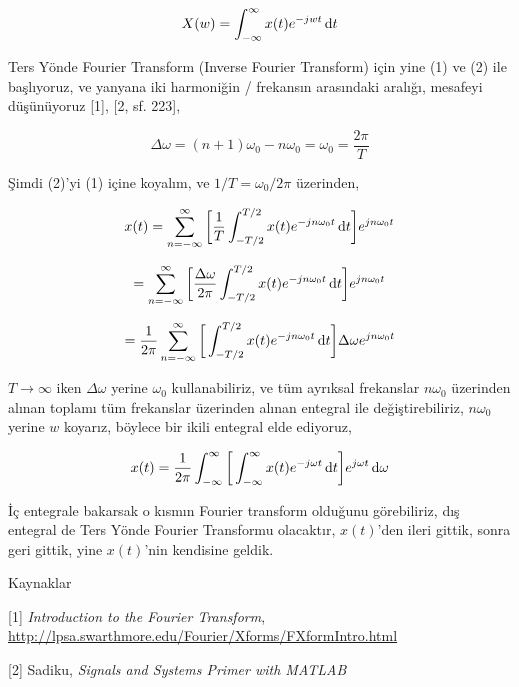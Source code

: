 \documentclass[12pt,fleqn]{article}\usepackage{../../common}
\begin{document}
$$ X(w) = \int _{-\infty}^{\infty} x(t) e^{-jwt} \,\mathrm{d} t$$

Ters Yönde Fourier Transform (Inverse Fourier Transform) için yine (1) ve
(2) ile başlıyoruz, ve yanyana iki harmoniğin / frekansın arasındaki
aralığı, mesafeyi düşünüyoruz [1], [2, sf. 223],

$$ \Delta \omega = (n+1) \omega_0 - n \omega_0 = \omega_0 = \frac{2\pi}{T} $$

Şimdi (2)'yi (1) içine koyalım, ve $1/T = \omega_0 / 2\pi$ üzerinden,

$$ 
x(t) = \sum _{n=-\infty}^{\infty} \bigg[ 
\frac{1}{T} \int _{-T/2}^{T/2} x(t) e ^{-jn\omega_0 t} \,\mathrm{d} t
\bigg]  e ^{jn\omega_0 t}
$$


$$ 
= \sum _{n=-\infty}^{\infty} \bigg[ 
\frac{\Delta \omega}{2\pi} \int _{-T/2}^{T/2} x(t) e ^{-jn\omega_0 t} \,\mathrm{d} t
\bigg]  e ^{jn\omega_0 t}
$$


$$ 
= \frac{1}{2\pi} \sum _{n=-\infty}^{\infty} \bigg[ 
\int _{-T/2}^{T/2} x(t) e ^{-jn\omega_0 t} \,\mathrm{d} t
\bigg] \Delta \omega e ^{jn\omega_0 t}
$$

$T \to \infty$ iken $\Delta \omega$ yerine $\omega_0$ kullanabiliriz, ve
tüm ayrıksal frekanslar $n\omega_0$ üzerinden alınan toplamı tüm frekanslar
üzerinden alınan entegral ile değiştirebiliriz, $n\omega_0$ yerine $w$
koyarız, böylece bir ikili entegral elde ediyoruz, 

$$ x(t) = \frac{1}{2\pi} \int _{-\infty}^{\infty} \bigg[
\int _{-\infty}^{\infty} x(t) e ^{-j\omega t} \,\mathrm{d} t
\bigg] e ^{j\omega t}  \,\mathrm{d} \omega
$$

İç entegrale bakarsak o kısmın Fourier transform olduğunu görebiliriz, dış
entegral de Ters Yönde Fourier Transformu olacaktır, $x(t)$'den ileri
gittik, sonra geri gittik, yine $x(t)$'nin kendisine geldik.


Kaynaklar

[1] {\em Introduction to the Fourier Transform}, \url{http://lpsa.swarthmore.edu/Fourier/Xforms/FXformIntro.html}

[2] Sadiku, {\em Signals and Systems Primer with MATLAB}
\end{document}
